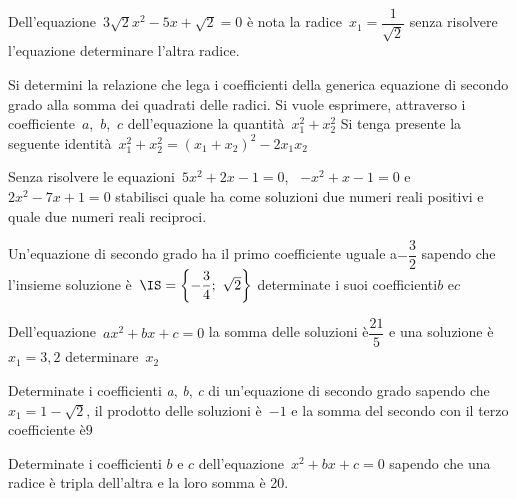 \begin{esercizio}
 \label{ese:3.69}
Dell'equazione~\(3 \sqrt{2} x^{2}-5 x + \sqrt{2} = 0\) 
è nota la radice~\(x_{1} = \dfrac{1}{\sqrt{2}}\) 
senza risolvere l'equazione determinare l'altra radice.
\end{esercizio}

\begin{esercizio}
 \label{ese:3.70}
Si determini la relazione che lega i coefficienti della generica equazione 
di secondo grado alla somma dei quadrati delle radici. Si vuole esprimere,
attraverso i coefficiente~\(a\),~\(b\),~\(c\) dell'equazione la 
quantità~\(x_{1}^{2} + x_{2}^{2}\) 
Si tenga presente la seguente identità~\(x_{1}^{2} + x_{2}^{2} = 
(x_{1} + x_{2} )^{2}-2 x_{1} x_{2}\)
\end{esercizio}

\begin{esercizio}
 \label{ese:3.71}
Senza risolvere le equazioni~\(5 x^{2} + 2 x-1 = 0\), 
~\(-x^{2} + x-1 = 0\) e~\(2 x^{2}-7 x +1 = 0\) stabilisci quale ha come 
soluzioni due numeri reali positivi e quale due numeri reali reciproci.
\end{esercizio}

\begin{esercizio}
 \label{ese:3.72}
Un'equazione di secondo grado ha il primo coefficiente uguale a\(- 
\dfrac{3}{2}\) 
sapendo che l'insieme soluzione è~\(\IS = \left\{-\dfrac{3}{4};~\sqrt{2} 
\right\}\)
determinate i suoi coefficienti\(b\) e\(c\)
\end{esercizio}

\begin{esercizio}
 \label{ese:3.73}
Dell'equazione~\(a x^{2} + b x + c = 0\) la somma delle soluzioni 
è\(\dfrac{21}{5}\) e una soluzione è~\(x_{1} = 3,2\) determinare~\(x_{2}\)
\end{esercizio}

\begin{esercizio}
 \label{ese:3.74}
Determinate i coefficienti \emph{a}, \emph{b}, \emph{c} di un'equazione di 
secondo grado sapendo che~\(x_{1} = 1-\sqrt{2}\), il prodotto delle soluzioni 
è~\(-1\) e la somma del secondo con il terzo coefficiente è\(9\)
\end{esercizio}

\begin{esercizio}
 \label{ese:3.75}
Determinate i coefficienti \(b\) e \(c\) dell'equazione~\(x^{2} + b x + c = 0\) 
sapendo che una radice è tripla dell'altra e la loro somma è 20.
\end{esercizio}

